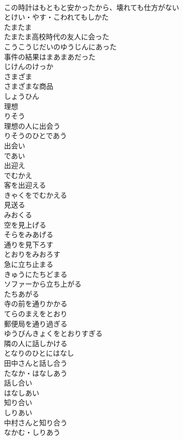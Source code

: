 \documentclass[8pt]{extreport}
\begin{document}
\begin{CJK}{UTF8}{min}
\\	この時計はもともと安かったから、壊れても仕方がない	
\\	とけい・やす・こわれてもしかた
\\	たまたま	
\\	たまたま高校時代の友人に会った	
\\	こうこうじだいのゆうじんにあった
\\	事件の結果はまあまあだった	
\\	じけんのけっか
\\	さまざま	
\\	さまざまな商品	
\\	しょうひん
\\	理想	
\\	りそう
\\	理想の人に出会う	
\\	りそうのひとであう
\\	出会い	
\\	であい
\\	出迎え	
\\	でむかえ
\\	客を出迎える	
\\	きゃくをでむかえる
\\	見送る	
\\	みおくる
\\	空を見上げる	
\\	そらをみあげる
\\	通りを見下ろす	
\\	とおりをみおろす
\\	急に立ち止まる	
\\	きゅうにたちどまる
\\	ソファーから立ち上がる	
\\	たちあがる
\\	寺の前を通りかかる	
\\	てらのまえをとおり
\\	郵便局を通り過ぎる	
\\	ゆうびんきょくをとおりすぎる
\\	隣の人に話しかける	
\\	となりのひとにはなし
\\	田中さんと話し合う	
\\	たなか・はなしあう
\\	話し合い	
\\	はなしあい
\\	知り合い	
\\	しりあい
\\	中村さんと知り合う	
\\	なかむ・しりあう

\end{CJK}
\end{document}
